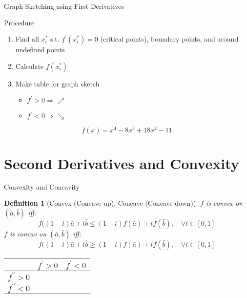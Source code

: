 \documentclass[a4paper,11pt]{article}
\newtheorem{defn}{Definition}
\begin{document}
\begin{frame}[t]{Graph Sketching using First Derivatives}
	\begin{block}{Procedure}
		\begin{enumerate}[(STEP 1)]
			\item Find all $x_i^\ast$ s.t. $f^\prime (x_i^\ast)=0$ (critical points), boundary points, and around undefined points
			\item Calculate $f(x_i^\ast)$
			\item Make table for graph sketch
			\begin{itemize}
				\item $f^\prime >0 \Rightarrow \nearrow$
				\item $f^\prime <0 \Rightarrow \searrow$
			\end{itemize}
		\end{enumerate}
	\end{block}
	\[
		f(x) = x^4 -8x^3 + 18x^2 - 11 \tag{Ex3.1}
	\]
\end{frame}


\section{Second Derivatives and Convexity} %
\label{sec:second_derivatives}

\begin{frame}[t]{Convexity and Concavity}
	\begin{defn}
		[Convex (Concave up), Concave (Concave down)]
		$f$ is convex on $(\bar a, \bar b)$ iff:
		\[
			f((1-t)\bar a + t \bar b \le (1-t)f(\bar a)+ tf(\bar b),\quad \forall t\in [0,1]
		\]
		$f$ is concav on $(\bar a, \bar b)$ iff:
		\[
			f((1-t)\bar a + t \bar b \ge (1-t)f(\bar a)+ tf(\bar b),\quad \forall t\in [0,1]
		\]
	\end{defn}
	\begin{center}
		\begin{tabular}{c|c|c}
		&	$f^\prime >0 $& $f^\prime<0$	\\
		\hline\hline
		$f^{\prime\prime}>0$&	&\\
		\hline
		$f^{\prime\prime}<0$&&\\
		\end{tabular}
	\end{center}
\end{frame}
\end{document}
